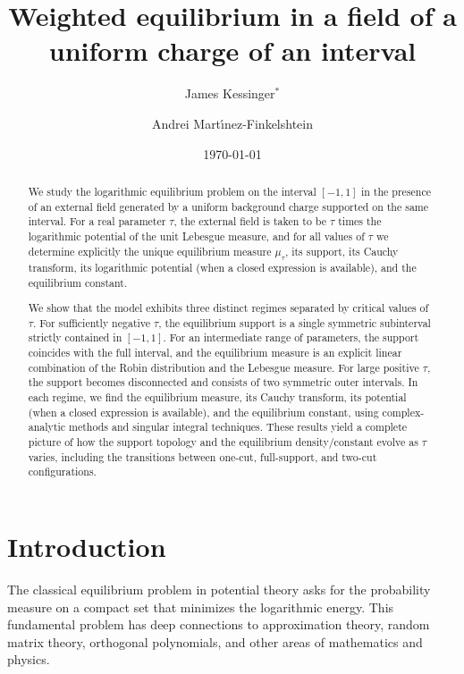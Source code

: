 \documentclass[reqno,11pt]{amsart}
\title[Weighted equilibrium in a field of a uniform charge]{Weighted equilibrium in a field of a uniform charge of an interval}
\author[J.~Kessinger]{James Kessinger$^*$}
\author[A.~Mart\'{\i}nez-Finkelshtein]{Andrei Mart\'{\i}nez-Finkelshtein}
\date{\today}
\theoremstyle{plain}
\theoremstyle{definition}
\theoremstyle{remark}
\numberwithin{equation}{section}
\begin{document}
\begin{abstract}
    
We study the logarithmic equilibrium problem on the interval $[-1,1]$ in the presence of an external field generated by a uniform background charge supported on the same interval. For a real parameter $\tau$, the external field is taken to be $\tau$ times the logarithmic potential of the unit Lebesgue measure, and for all values of $\tau$ we determine explicitly the unique equilibrium measure $\mu_\tau$, its support, its Cauchy transform, its logarithmic potential (when a closed expression is available), and the equilibrium constant.

We show that the model exhibits three distinct regimes separated by critical values of $\tau$. For sufficiently negative $\tau$, the equilibrium support is a single symmetric subinterval strictly contained in $[-1,1]$. For an intermediate range of parameters, the support coincides with the full interval, and the equilibrium measure is an explicit linear combination of the Robin distribution and the Lebesgue measure. For large positive $\tau$, the support becomes disconnected and consists of two symmetric outer intervals. In each regime, we find the equilibrium measure, its Cauchy transform, its potential (when a closed expression is available), and the equilibrium constant, using complex-analytic methods and singular integral techniques. These results yield a complete picture of how the support topology and the equilibrium density/constant evolve as $\tau$ varies, including the transitions between one-cut, full-support, and two-cut configurations.
\end{abstract}


\maketitle



\section{Introduction} \label{sec:intro}

The classical equilibrium problem in potential theory asks for the probability measure on a compact set that minimizes the logarithmic energy. This fundamental problem has deep connections to approximation theory, random matrix theory, orthogonal polynomials, and other areas of mathematics and physics.
\end{document}
